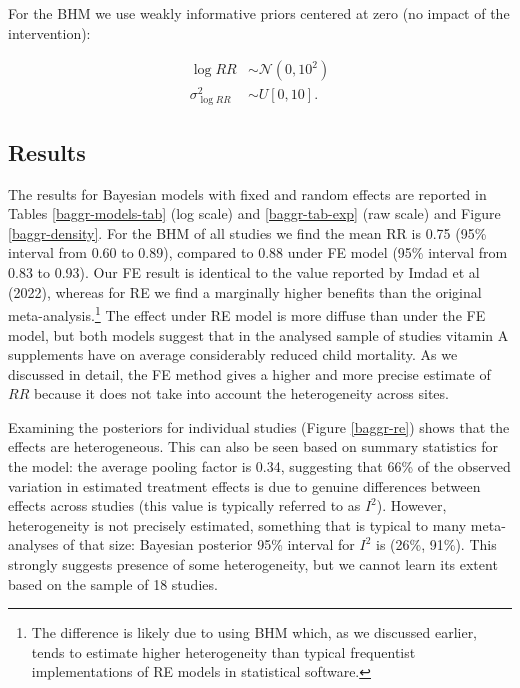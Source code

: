 \documentclass[12pt]{article}
\begin{document}
For the BHM we use weakly informative priors centered at zero (no impact of the intervention):

\begin{equation} \label{lognormal priors}
\begin{aligned}
\log{RR} &\sim  \mathcal{N}(0,10^2) \\
\sigma^2_{\log{RR}} &\sim U[0,10].
\end{aligned}
\end{equation}



\subsection{ Results  }


The results for Bayesian models with fixed and random effects are reported in Tables \ref{baggr-models-tab} (log scale) and \ref{baggr-tab-exp} (raw scale) and Figure \ref{baggr-density}. For the BHM of all studies we find the mean RR is 0.75 (95\% interval from 0.60 to 0.89), compared to 0.88 under FE model (95\% interval from 0.83 to 0.93). Our FE result is identical to the value reported by Imdad et al (2022), whereas for RE we find a marginally higher benefits than the original meta-analysis.\footnote{The difference is likely due to using BHM which, as we discussed earlier, tends to  estimate higher heterogeneity than typical frequentist implementations of RE models in statistical software.}
The effect under RE model is more diffuse than under the FE model, but both models suggest that in the analysed sample of studies vitamin A supplements have on average considerably reduced child mortality. As we discussed in detail, the FE method gives a higher and more precise estimate of $RR$ because it does not take into account the heterogeneity across sites. 

Examining the posteriors for individual studies (Figure \ref{baggr-re}) shows that the effects are heterogeneous. This can also be seen based on summary statistics for the model: the average pooling factor is 0.34, suggesting that 66\% of the observed variation in estimated treatment effects is due to genuine differences between effects across studies (this value is typically referred to as $I^2$). However, heterogeneity is not precisely estimated, something that is typical to many meta-analyses of that size: Bayesian posterior 95\% interval for $I^2$ is (26\%, 91\%). This strongly suggests presence of some heterogeneity, but we cannot learn its extent based on the sample of 18 studies.
\end{document}
